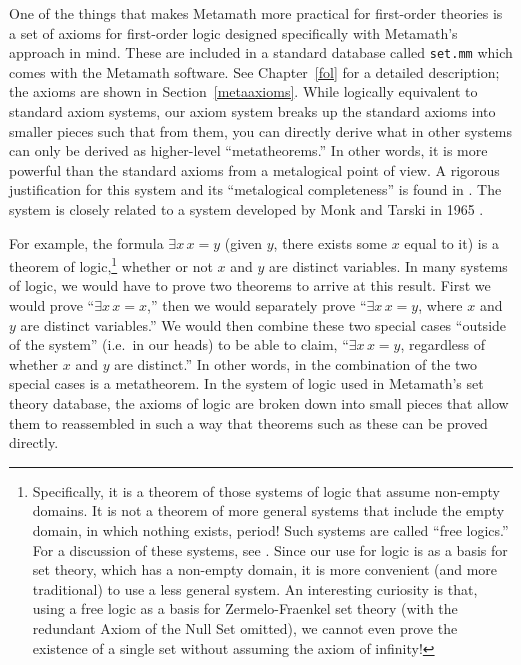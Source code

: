 One of the things that makes Metamath more practical for
first-order theories is a set of axioms for first-order logic designed
specifically with Metamath's approach in mind.  These are included in a
standard database called \texttt{set.mm}
which comes with the Metamath software.  See Chapter~\ref{fol} for a detailed
description; the axioms are shown in Section~\ref{metaaxioms}.  While
logically equivalent to standard axiom systems, our axiom system breaks
up the standard axioms into smaller pieces such that from them, you can
directly derive what in other systems can only be derived as higher-level
``metatheorems.''  In other words, it is more powerful than
the standard axioms from a metalogical point of view.  A rigorous
justification for this system and its ``metalogical
completeness'' is found in
\cite{Megill}.  The system is closely related to a
system developed by Monk and Tarski in 1965 \cite{Monks}.

For example, the formula $\exists x \, x = y $ (given $y$, there exists some
$x$ equal to it) is a theorem of logic,\footnote{Specifically, it is a theorem
of those systems of logic that assume non-empty domains.  It is not a theorem
of more general systems that include the empty domain, in
which nothing exists, period!  Such systems are called ``free
logics.'' For a discussion of these systems, see
\cite{Leblanc}.  Since our use for logic is as a basis
for set theory, which has a non-empty domain, it is more convenient (and more
traditional) to use a less general system.  An interesting curiosity is that,
using a free logic as a basis for Zermelo-Fraenkel set
theory (with the redundant Axiom of the
Null Set omitted), we cannot even prove the
existence of a single set without assuming the axiom of infinity!} whether or not $x$ and $y$ are distinct variables.  In many systems of logic, we would have to prove two theorems to
arrive at this result.  First we would prove ``$\exists x \, x = x $,'' then
we would separately prove ``$\exists x \, x = y $, where $x$ and $y$ are
distinct variables.''  We would then combine these two special cases ``outside
of the system'' (i.e.\ in our heads) to be able to claim, ``$\exists x \, x =
y $, regardless of whether $x$ and $y$ are distinct.''  In other words, in the
combination of the two special cases is a
metatheorem.  In the system of logic
used in Metamath's set theory
database, the axioms of logic are broken down into small pieces that allow
them to reassembled in such a way that theorems such as these can be proved
directly.

